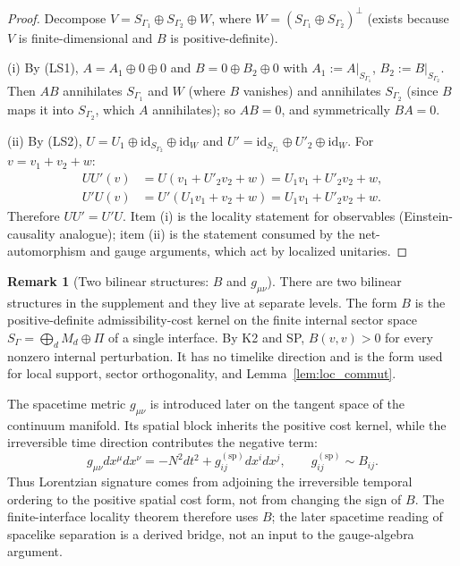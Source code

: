 \documentclass[11pt]{article}
\theoremstyle{definition}
\newtheorem{remark}[theorem]{Remark}
\begin{document}
\begin{proof}
Decompose $V = S_{\Gamma_1} \oplus S_{\Gamma_2} \oplus W$, where
$W = (S_{\Gamma_1} \oplus S_{\Gamma_2})^\perp$ (exists because $V$ is
finite-dimensional and $B$ is positive-definite).

(i)  By (LS1), $A = A_1 \oplus 0 \oplus 0$ and
$B = 0 \oplus B_2 \oplus 0$ with
$A_1 := A|_{S_{\Gamma_1}}$, $B_2 := B|_{S_{\Gamma_2}}$.
Then $AB$ annihilates $S_{\Gamma_1}$ and $W$ (where $B$ vanishes) and
annihilates $S_{\Gamma_2}$ (since $B$ maps it into $S_{\Gamma_2}$,
which $A$ annihilates); so $AB = 0$, and symmetrically $BA = 0$.

(ii)  By (LS2), $U = U_1 \oplus \mathrm{id}_{S_{\Gamma_2}} \oplus
\mathrm{id}_W$ and $U' = \mathrm{id}_{S_{\Gamma_1}} \oplus U'_2 \oplus
\mathrm{id}_W$.  For $v = v_1 + v_2 + w$:
\begin{align*}
  UU'(v) &= U(v_1 + U'_2 v_2 + w) = U_1 v_1 + U'_2 v_2 + w,\\
  U'U(v) &= U'(U_1 v_1 + v_2 + w) = U_1 v_1 + U'_2 v_2 + w.
\end{align*}
Therefore $UU' = U'U$.  Item (i) is the locality statement for
observables (Einstein-causality analogue); item (ii) is the statement
consumed by the net-automorphism and gauge arguments, which act by
localized unitaries.
\end{proof}

\begin{remark}[Two bilinear structures: $B$ and $g_{\mu\nu}$]%
\label{rem:two_bilinear}
There are two bilinear structures in the supplement and they live at
separate levels.  The form $B$ is the positive-definite admissibility-cost
kernel on the finite internal sector space
$S_\Gamma=\bigoplus_d M_d\oplus\Pi$ of a single interface.  By K2 and SP,
$B(v,v)>0$ for every nonzero internal perturbation.  It has no timelike
direction and is the form used for local support, sector orthogonality, and
Lemma~\ref{lem:loc_commut}.

The spacetime metric $g_{\mu\nu}$ is introduced later on the tangent space
of the continuum manifold.  Its spatial block inherits the positive cost
kernel, while the irreversible time direction contributes the negative
term:
\[
  g_{\mu\nu}dx^\mu dx^\nu=-N^2dt^2+g^{(\mathrm{sp})}_{ij}dx^idx^j,
  \qquad g^{(\mathrm{sp})}_{ij}\sim B_{ij}.
\]
Thus Lorentzian signature comes from adjoining the irreversible temporal
ordering to the positive spatial cost form, not from changing the sign of
$B$.  The finite-interface locality theorem therefore uses $B$; the later
spacetime reading of spacelike separation is a derived bridge, not an
input to the gauge-algebra argument.
\end{remark}
\end{document}
